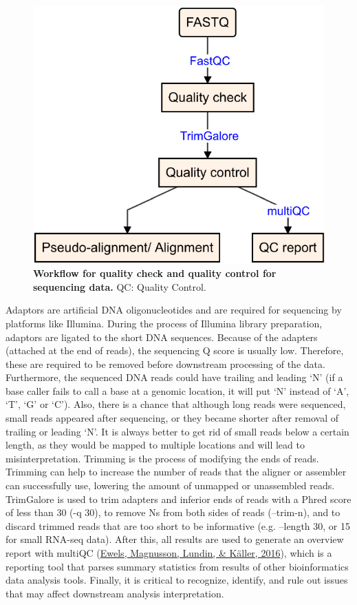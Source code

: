 \documentclass[12pt,twoside]{reedthesis}
\begin{document}
\begin{figure}[h]

{\centering \includegraphics{thesis_files/figure-latex/mf3-1} 

}

\caption[Workflow for quality check and quality control for sequencing data]{\textbf{Workflow for quality check and quality control for sequencing data.} QC: Quality Control.}\label{fig:mf3}
\end{figure}
Adaptors are artificial DNA oligonucleotides and are required for
sequencing by platforms like Illumina. During the process of Illumina
library preparation, adaptors are ligated to the short DNA sequences.
Because of the adapters (attached at the end of reads), the sequencing Q
score is usually low. Therefore, these are required to be removed before
downstream processing of the data. Furthermore, the sequenced DNA reads
could have trailing and leading `N' (if a base caller fails to call a
base at a genomic location, it will put `N' instead of `A', `T', `G' or
`C'). Also, there is a chance that although long reads were sequenced,
small reads appeared after sequencing, or they became shorter after
removal of trailing or leading `N'. It is always better to get rid of
small reads below a certain length, as they would be mapped to multiple
locations and will lead to misinterpretation. Trimming is the process of
modifying the ends of reads. Trimming can help to increase the number of
reads that the aligner or assembler can successfully use, lowering the
amount of unmapped or unassembled reads. TrimGalore is used to trim
adapters and inferior ends of reads with a Phred score of less than 30
(-q 30), to remove Ns from both sides of reads (--trim-n), and to
discard trimmed reads that are too short to be informative (e.g.
--length 30, or 15 for small RNA-seq data). After this, all results are
used to generate an overview report with multiQC (\protect\hyperlink{ref-ewels2016}{Ewels, Magnusson, Lundin, \& Käller, 2016}), which is
a reporting tool that parses summary statistics from results of other
bioinformatics data analysis tools. Finally, it is critical to
recognize, identify, and rule out issues that may affect downstream
analysis interpretation.
\end{document}
